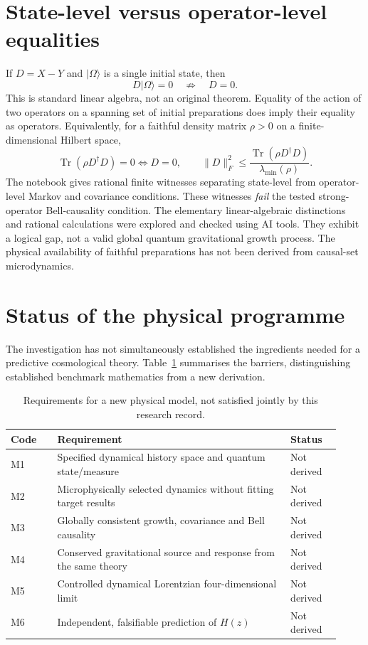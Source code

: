 \documentclass[11pt,a4paper]{article}
\begin{document}
\section{State-level versus operator-level equalities}
If $D=X-Y$ and $|\Omega\rangle$ is a single initial state, then
\begin{equation}
 D|\Omega\rangle=0\quad\not\Rightarrow\quad D=0.
\end{equation}
This is standard linear algebra, not an original theorem. Equality of the action of two operators on a spanning set of initial preparations does imply their equality as operators. Equivalently, for a faithful density matrix $\rho>0$ on a finite-dimensional Hilbert space,
\begin{equation}
\operatorname{Tr}(\rho D^\dagger D)=0\iff D=0,
\qquad \|D\|_F^2\le\frac{\operatorname{Tr}(\rho D^\dagger D)}{\lambda_{\min}(\rho)}.
\end{equation}
The notebook gives rational finite witnesses separating state-level from operator-level Markov and covariance conditions. These witnesses \emph{fail} the tested strong-operator Bell-causality condition. The elementary linear-algebraic distinctions and rational calculations were explored and checked using AI tools. They exhibit a logical gap, not a valid global quantum gravitational growth process. The physical availability of faithful preparations has not been derived from causal-set microdynamics.

\section{Status of the physical programme}
The investigation has not simultaneously established the ingredients needed for a predictive cosmological theory. Table~\ref{tab:missing} summarises the barriers, distinguishing established benchmark mathematics from a new derivation.
\begin{table}[ht]
\centering\small
\caption{Requirements for a new physical model, not satisfied jointly by this research record.}\label{tab:missing}
\begin{tabular}{@{}p{0.13\linewidth}p{0.65\linewidth}p{0.14\linewidth}@{}}\toprule
Code & Requirement & Status \\ \midrule
M1 & Specified dynamical history space and quantum state/measure & Not derived \\
M2 & Microphysically selected dynamics without fitting target results & Not derived \\
M3 & Globally consistent growth, covariance and Bell causality & Not derived \\
M4 & Conserved gravitational source and response from the same theory & Not derived \\
M5 & Controlled dynamical Lorentzian four-dimensional limit & Not derived \\
M6 & Independent, falsifiable prediction of $H(z)$ & Not derived \\ \bottomrule
\end{tabular}
\end{table}
\end{document}
